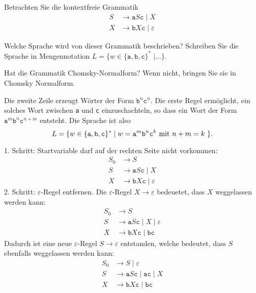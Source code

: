 Betrachten Sie die kontextfreie Grammatik
\begin{align*}
S&\to \texttt{a} S \texttt{c} \;|\; X
\\
X&\to \texttt{b}X\texttt{c} \;|\; \varepsilon
\end{align*}
\begin{teilaufgaben}
\item
Welche Sprache wird von dieser Grammatik beschrieben?
Schreiben Sie die Sprache in Mengennotation 
$L=\{
w\in\{\texttt{a},\texttt{b},\texttt{c}\}^*
\;|\dots\}$.
\item
Hat die Grammatik Chomsky-Normalform?
Wenn nicht, bringen Sie sie in Chomsky Normalform.
\end{teilaufgaben}


\begin{loesung}
\begin{teilaufgaben}
\item
Die zweite Zeile erzeugt Wörter der Form $\texttt{b}^n\texttt{c}^n$.
Die erste Regel ermöglicht, ein solches Wort zwischen \texttt{a} und
\texttt{c} einzuschachteln, so dass ein Wort der Form
$\texttt{a}^m\texttt{b}^n\texttt{c}^{n+m}$ entsteht.
Die Sprache ist also
\[
L=\{
w\in\{\texttt{a},\texttt{b},\texttt{c}\}^*
\;|\;
\text{$
w=
\texttt{a}^m \texttt{b}^n \texttt{c}^{k}$
mit
$n+m=k$
}
\}.
\]
\item
1. Schritt: Startvariable darf auf der rechten Seite nicht vorkommen:
\begin{align*}
S_0 & \to S
\\
S & \to \texttt{a} S \texttt{c} \;|\; X
\\
X & \to \texttt{b}X\texttt{c} \;|\; \varepsilon
\end{align*}
2. Schritt: $\varepsilon$-Regel entfernen.
Die $\varepsilon$-Regel $X\to\varepsilon$ bedeuetet, dass $X$ weggelassen
werden kann:
\begin{align*}
S_0 & \to S
\\
S & \to \texttt{a} S \texttt{c} \;|\; X \;|\; \varepsilon
\\
X & \to \texttt{b}X\texttt{c} \;|\; \texttt{bc}
\end{align*}
Dadurch ist eine neue $\varepsilon$-Regel $S\to\varepsilon$ entstanden,
welche bedeutet, dass $S$ ebenfalls weggelassen werden kann:
\begin{align*}
S_0 & \to S \;|\; \varepsilon
\\
S & \to
\texttt{a} S \texttt{c} \;|\; \texttt{ac} \;|\; X
\\
X & \to \texttt{b}X\texttt{c} \;|\; \texttt{bc}

\end{align*}
\end{teilaufgaben}
\end{loesung}
